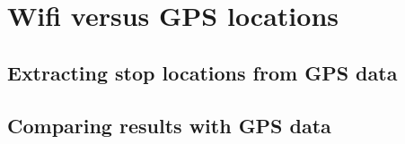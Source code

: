 \chapter{Wifi versus GPS locations}
\section{Extracting stop locations from GPS data}
\section{Comparing results with GPS data}
